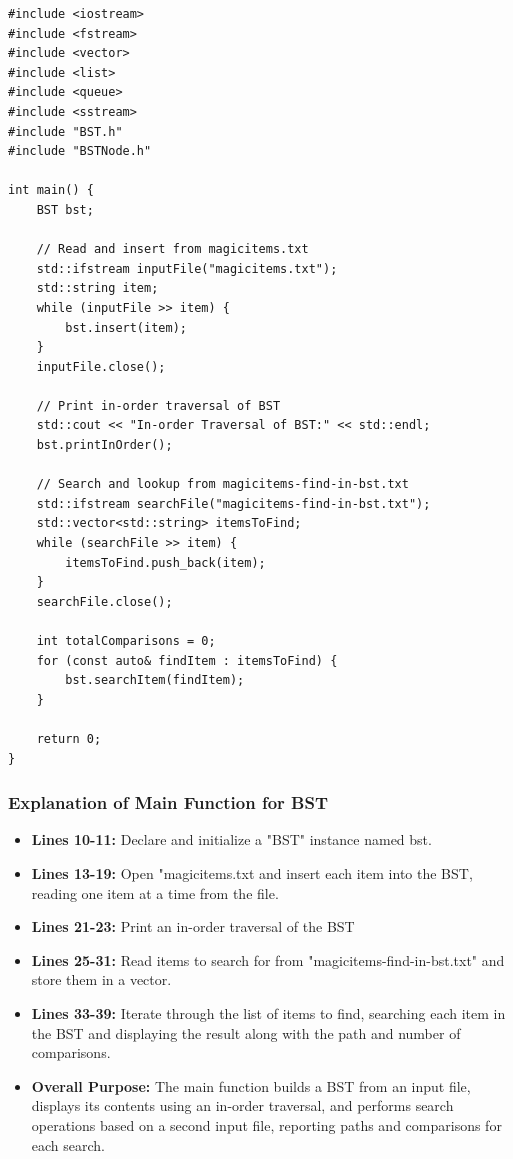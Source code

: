 \documentclass{article}
\begin{document}
\begin{lstlisting}[caption={Main Function for BST}]
#include <iostream>
#include <fstream>
#include <vector>
#include <list>
#include <queue>
#include <sstream>
#include "BST.h"
#include "BSTNode.h"

int main() {
    BST bst;

    // Read and insert from magicitems.txt
    std::ifstream inputFile("magicitems.txt");
    std::string item;
    while (inputFile >> item) {
        bst.insert(item);
    }
    inputFile.close();

    // Print in-order traversal of BST
    std::cout << "In-order Traversal of BST:" << std::endl;
    bst.printInOrder();

    // Search and lookup from magicitems-find-in-bst.txt
    std::ifstream searchFile("magicitems-find-in-bst.txt");
    std::vector<std::string> itemsToFind;
    while (searchFile >> item) {
        itemsToFind.push_back(item);
    }
    searchFile.close();

    int totalComparisons = 0;
    for (const auto& findItem : itemsToFind) {
        bst.searchItem(findItem);
    }

    return 0;
}
\end{lstlisting}

\subsubsection{Explanation of Main Function for BST}
\begin{itemize}
    \item \textbf{Lines 10-11:} Declare and initialize a "BST" instance named bst.
    \item \textbf{Lines 13-19:} Open "magicitems.txt and insert each item into the BST, reading one item at a time from the file.
    \item \textbf{Lines 21-23:} Print an in-order traversal of the BST
    \item \textbf{Lines 25-31:} Read items to search for from "magicitems-find-in-bst.txt" and store them in a vector.
    \item \textbf{Lines 33-39:} Iterate through the list of items to find, searching each item in the BST and displaying the result along with the  path and number of comparisons.
    \item \textbf{Overall Purpose:} The main function builds a BST from an input file, displays its contents using an in-order traversal, and performs search operations based on a second input file, reporting paths and comparisons for each search.
\end{itemize}
\end{document}
